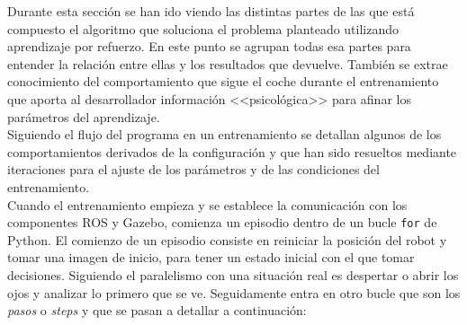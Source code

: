 Durante esta sección se han ido viendo las distintas partes de las que está compuesto el algoritmo que soluciona el problema planteado utilizando aprendizaje por refuerzo. En este punto se agrupan todas esa partes para entender la relación entre ellas y los resultados que devuelve. También se extrae conocimiento del comportamiento que sigue el coche durante el entrenamiento que aporta al desarrollador información <<psicológica>> para afinar los  parámetros del aprendizaje.\\

Siguiendo el flujo del programa en un entrenamiento se detallan algunos de los comportamientos derivados de la configuración y que han sido resueltos mediante iteraciones para el ajuste de los parámetros y de las condiciones del entrenamiento.\\

Cuando el entrenamiento empieza y se establece la comunicación con los componentes ROS y Gazebo, comienza un episodio dentro de un bucle \texttt{for} de Python. El comienzo de un episodio consiste en reiniciar la posición del robot y tomar una imagen de inicio, para tener un estado inicial con el que tomar decisiones. Siguiendo el paralelismo con una situación real es despertar o abrir los ojos y analizar lo primero que se ve. Seguidamente entra en otro bucle que son los \textit{pasos} o \textit{steps} y que se pasan a detallar a continuación:\\

